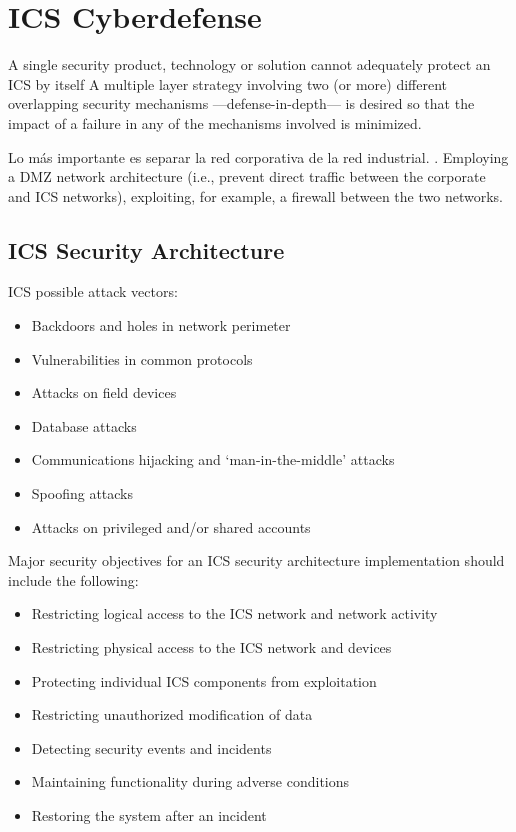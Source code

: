 \chapter{ICS Cyberdefense}

A single security product, technology or solution cannot adequately protect an ICS
by itself
A multiple layer strategy involving two (or more) different overlapping security
mechanisms  ---defense-in-depth--- is desired so that the
impact of a failure in any of the mechanisms involved is minimized.

Lo más importante es separar la red corporativa de la red industrial.
.
Employing a DMZ network architecture (i.e., prevent direct traffic between
the corporate and ICS networks), exploiting, for example, a firewall between the two networks.


\section{ICS Security Architecture}

\begin{paracol}{2}
   ICS possible attack vectors:
   \begin{itemize}
      \item Backdoors and holes in network perimeter
      \item Vulnerabilities in common protocols
      \item Attacks on field devices
      \item Database attacks
      \item Communications hijacking and `man-in-the-middle' attacks
      \item Spoofing attacks
      \item Attacks on privileged and/or shared accounts
   \end{itemize}
   
   \switchcolumn
   Major security objectives for an ICS security architecture implementation should include the following:
   \begin{itemize}
	\item Restricting logical access to the ICS network and network activity
	\item Restricting physical access to the ICS network and devices
	\item Protecting individual ICS components from exploitation
	\item Restricting unauthorized modification of data
	\item Detecting security events and incidents
	\item Maintaining functionality during adverse conditions
	\item Restoring the system after an incident
   \end{itemize}
\end{paracol}


